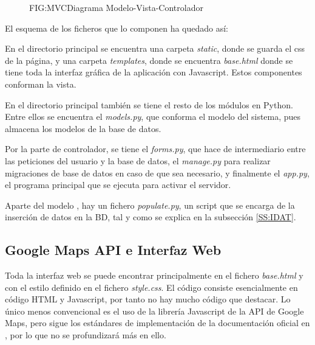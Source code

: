       \begin{figure}[Diagrama Modelo-Vista-Controlador]{FIG:MVC}{Diagrama Modelo-Vista-Controlador}
      \end{figure}
      
      El esquema de los ficheros que lo componen ha quedado así:
      
      En el directorio principal se encuentra una carpeta \textit{static}, donde se guarda el css de la página, y una carpeta \textit{templates}, donde se encuentra \textit{base.html} donde se tiene toda la interfaz gráfica de la aplicación con Javascript. Estos componentes conforman la vista. 
       
      En el directorio principal también se tiene el resto de los módulos en Python. 
      Entre ellos se encuentra el \textit{models.py}, que conforma el modelo del sistema, pues almacena los modelos de la base de datos.
      
      Por la parte de controlador, se tiene el \textit{forms.py}, que hace de intermediario entre las peticiones del usuario y la base de datos, el \textit{manage.py} para realizar migraciones de base de datos en caso de que sea necesario, y finalmente el \textit{app.py}, el programa principal que se ejecuta para activar el servidor.
      
      Aparte del modelo , hay un fichero \textit{populate.py}, un script que se encarga de la inserción de datos en la BD, tal y como se explica en la subsección \ref{SS:IDAT}.
      
      
    \subsection{Google Maps API e Interfaz Web}
      Toda la interfaz web se puede encontrar principalmente en el fichero \textit{base.html} y con el estilo definido en el fichero \textit{style.css}. El código consiste esencialmente en código HTML y Javascript, por tanto no hay mucho código que destacar. Lo único menos convencional es el uso de la  librería Javascript de la API de Google Maps, pero sigue los estándares de implementación de la documentación oficial en \cite{gmaps}, por lo que no se profundizará más en ello.
      
